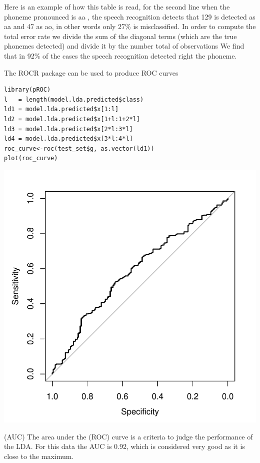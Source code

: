 \documentclass[]{report}
\begin{document}
Here is an example of how this table is read, for the second line
when the phoneme pronounced is aa , the speech recognition detects that 129 is detected as aa and 47 as ao, in other words only 27\% is misclassified.
In order to compute the total error rate we divide the sum of the diagonal terms (which are the true phonemes detected) and divide it by the number total of observations We find that in 92\% of the cases the speech recognition detected right the phoneme.

The ROCR package can be used to produce ROC curves
\begin{lstlisting}
library(pROC)
l   = length(model.lda.predicted$class)
ld1 = model.lda.predicted$x[1:l]
ld2 = model.lda.predicted$x[1+l:1+2*l]
ld3 = model.lda.predicted$x[2*l:3*l]
ld4 = model.lda.predicted$x[3*l:4*l]
roc_curve<-roc(test_set$g, as.vector(ld1))
plot(roc_curve)
\end{lstlisting}


\begin{center}
	\includegraphics{Figures/lda_roc.pdf}
\end{center}

(AUC) The area under the (ROC) curve is a criteria to judge the performance of the LDA. For this data the AUC is 0.92, which is considered very good as it is close to the maximum.
\end{document}
